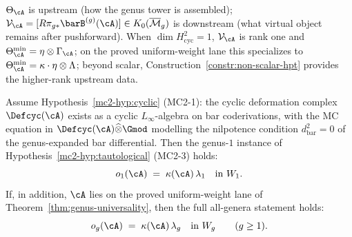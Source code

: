 \begin{remark}
\label{rem:theta-vs-VA}
$\Theta_\cA$ is upstream (how the genus tower is assembled);
$\mathcal{V}_\cA=[R\pi_{g*}\barB^{(g)}(\cA)]\in K_0(\overline{\mathcal{M}}_g)$
is downstream (what virtual object remains after pushforward).
When $\dim H^2_{\mathrm{cyc}}=1$, $\mathcal{V}_\cA$ is rank one
and $\Theta_\cA^{\min}=\eta\otimes\Gamma_\cA$; on the proved
uniform-weight lane this specializes to
$\Theta_\cA^{\min}=\kappa\cdot\eta\otimes\Lambda$;
beyond scalar, Construction~\ref{constr:non-scalar-hpt} provides
the higher-rank upstream data.
\end{remark}

\begin{theorem}\label{thm:tautological-line-support}
Assume Hypothesis~\textup{\ref{mc2-hyp:cyclic}} \textup{(MC2-1)}: the
cyclic deformation complex $\Defcyc(\cA)$ exists as a cyclic
$L_\infty$-algebra on bar coderivations, with the MC equation in
$\Defcyc(\cA)\widehat{\otimes}\Gmod$ modelling the nilpotence
condition $d_{\mathrm{bar}}^2 = 0$ of the genus-expanded bar
differential.
Then the genus-$1$ instance of
Hypothesis~\textup{\ref{mc2-hyp:tautological}} \textup{(MC2-3)}
holds:
\[
  o_1(\cA) \;=\; \kappa(\cA)\,\lambda_1
  \quad\text{in } W_1 .
\]
If, in addition, $\cA$ lies on the proved uniform-weight lane of
Theorem~\textup{\ref{thm:genus-universality}}, then the full
all-genera statement holds:
\[
  o_g(\cA) \;=\; \kappa(\cA)\,\lambda_g
  \quad\text{in } W_g
  \qquad (g \geq 1).
\]
\end{theorem}

